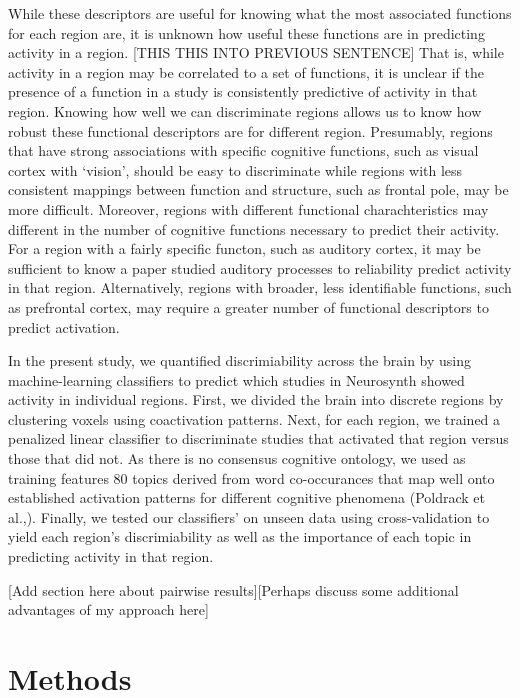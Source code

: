 While these descriptors are useful for knowing what the most associated functions for each region are, it is unknown how useful these functions are in predicting activity in a region. [THIS THIS INTO PREVIOUS SENTENCE]
That is, while activity in a region may be correlated to a set of functions, it is unclear if the presence of a function in a study is consistently predictive of activity in that region. Knowing how well we can discriminate regions allows us to know how robust these functional descriptors are for different region. Presumably, regions that have strong associations with specific cognitive functions, such as visual cortex with ‘vision’, should be easy to discriminate while regions with less consistent mappings between function and structure, such as frontal pole, may be more difficult. Moreover, regions with different functional charachteristics may different in the number of cognitive functions necessary to predict their activity. For a region with a fairly specific functon, such as auditory cortex, it may be sufficient to know a paper studied auditory processes to reliability predict activity in that region. Alternatively, regions with broader, less identifiable functions, such as prefrontal cortex, may require a greater number of functional descriptors to predict activation. 

In the present study, we quantified discrimiability across the brain by using machine-learning classifiers to predict which studies in Neurosynth showed activity in individual regions. First, we divided the brain into discrete regions by clustering voxels using coactivation patterns. Next, for each region, we trained a penalized linear classifier to discriminate studies that activated that region versus those that did not. As there is no consensus cognitive ontology, we used as training features 80 topics derived from word co-occurances that map well onto established activation patterns for different cognitive phenomena (Poldrack et al.,). Finally, we tested our classifiers’ on unseen data using cross-validation to yield each region’s discrimiability as well as the importance of each topic in predicting activity in that region.

[Add section here about pairwise results][Perhaps discuss some additional advantages of my approach here]

\chapter{Methods}
\label{methods}

